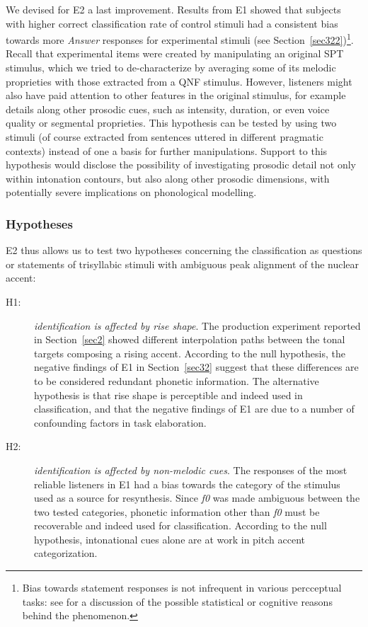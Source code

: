 We devised for E2 a last improvement. Results from E1 showed that subjects with higher correct classification rate of control stimuli had a consistent bias towards more \textit{Answer} responses for experimental stimuli (see Section~\ref{sec322})\footnote{Bias towards statement responses is not infrequent in various percceptual tasks: see \citet{petrone2014intonation} for a discussion of the possible statistical or cognitive \citep{pandelaere2006question} reasons behind the phenomenon.}. Recall that experimental items were created by manipulating an original SPT stimulus, which we tried to de-characterize by averaging some of its melodic proprieties with those extracted from a QNF stimulus. However, listeners might also have paid attention to other features in the original stimulus, for example details along other prosodic cues, such as intensity, duration, or even voice quality or segmental proprieties. This hypothesis can be tested by using two stimuli (of course extracted from sentences uttered in different pragmatic contexts) instead of one a basis for further manipulations. Support to this hypothesis would disclose the possibility of investigating prosodic detail not only within intonation contours, but also along other prosodic dimensions, with potentially severe implications on phonological modelling.

\subsubsection{Hypotheses}\label{sec3301}
E2 thus allows us to test two hypotheses concerning the classification as questions or statements of trisyllabic stimuli with ambiguous peak alignment of the nuclear accent:

\begin{description}
   \item[H1:] \textit{identification is affected by rise shape}. The production experiment reported in Section~\ref{sec2} showed different interpolation paths between the tonal targets composing a rising accent. According to the null hypothesis, the negative findings of E1 in Section~\ref{sec32} suggest that these differences are to be considered redundant phonetic information. The alternative hypothesis is that rise shape is perceptible and indeed used in classification, and that the negative findings of E1 are due to a number of confounding factors in task elaboration.
   \item[H2:] \textit{identification is affected by non-melodic cues}. The responses of the most reliable listeners in E1 had a bias towards the category of the stimulus used as a source for resynthesis. Since \textit{f0} was made ambiguous between the two tested categories, phonetic information other than \textit{f0} must be recoverable and indeed used for classification. According to the null hypothesis, intonational cues alone are at work in pitch accent categorization.
\end{description}

